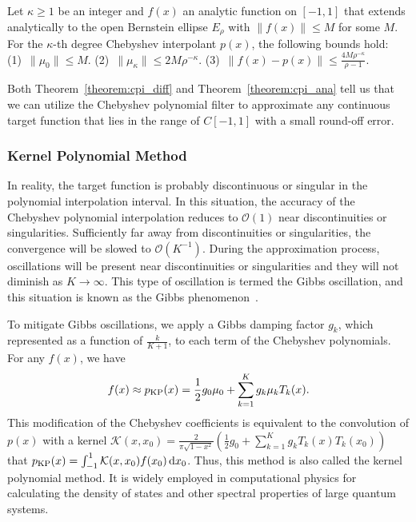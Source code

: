 \begin{theorem}\label{theorem:cpi_ana}
Let $\kappa \geq 1$ be an integer and $f(x)$ an analytic function on $[-1, 1]$ that extends analytically to the open Bernstein ellipse $E_{\rho}$ with $\lVert{f(x)}\rVert \leq M$ for some $M$. For the $\kappa$-th degree Chebyshev interpolant $p(x)$, the following bounds hold: (1)~$\lVert{\mu_{0}}\rVert \leq M$. (2)~$\lVert{\mu_{\kappa}}\rVert \leq 2M\rho^{-\kappa}$. (3)~$\lVert{f(x)-p(x)}\rVert \leq \frac{4M\rho^{-\kappa}}{\rho-1}$.
\end{theorem}

Both Theorem~\ref{theorem:cpi_diff} and Theorem~\ref{theorem:cpi_ana} tell us that we can utilize the Chebyshev polynomial filter to approximate any continuous target function that lies in the range of $C[-1, 1]$ with a small round-off error.

\subsubsection{Kernel Polynomial Method}
In reality, the target function is probably discontinuous or singular in the polynomial interpolation interval. In this situation, the accuracy of the Chebyshev polynomial interpolation reduces to $\mathcal{O}(1)$ near discontinuities or singularities. Sufficiently far away from discontinuities or singularities, the convergence will be slowed to $\mathcal{O}(K^{-1})$. During the approximation process, oscillations will be present near discontinuities or singularities and they will not diminish as $K \to \infty$. This type of oscillation is termed the Gibbs oscillation, and this situation is known as the Gibbs phenomenon~\citep{Hewitt1979}.

To mitigate Gibbs oscillations, we apply a Gibbs damping factor $g_{k}$, which represented as a function of $\frac{k}{K+1}$, to each term of the Chebyshev polynomials. For any $f(x)$, we have
\begin{equation}\label{eq:kpm}
\centering
{f(x)}\approx{p}_{\text{KP}}(x) = \frac{1}{2}g_{0}\mu_{0} + \sum_{k=1}^{K}g_{k}\mu_{k}T_{k}(x).
\end{equation}
This modification of the Chebyshev coefficients is equivalent to the convolution of $p(x)$ with a kernel $\mathcal{K}(x,x_{0}) = \frac{2}{\pi\sqrt{1-x^{2}}}\left(\frac{1}{2}g_{0} + \sum_{k=1}^{K}g_{k}T_{k}(x)T_{k}(x_{0})\right)$ that $p_{\text{KP}}(x) = \int_{-1}^{1}\mathcal{K}(x,x_{0})f(x_{0})\mathop{}\!\mathrm{d}{x_{0}}$. Thus, this method is also called the kernel polynomial method. It is widely employed in computational physics for calculating the density of states and other spectral properties of large quantum systems. 


